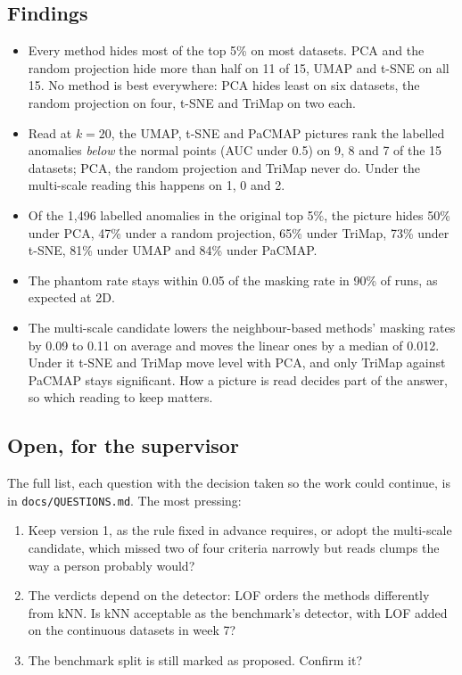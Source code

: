 \subsection*{Findings}

\begin{itemize}
  \item Every method hides most of the top 5\% on most datasets. PCA and
    the random projection hide more than half on 11 of 15, UMAP and t-SNE
    on all 15. No method is best everywhere: PCA hides least on six
    datasets, the random projection on four, t-SNE and TriMap on two each.
  \item Read at $k = 20$, the UMAP, t-SNE and PaCMAP pictures rank the
    labelled anomalies \emph{below} the normal points (AUC under 0.5) on
    9, 8 and 7 of the 15 datasets; PCA, the random projection and TriMap
    never do. Under the multi-scale reading this happens on 1, 0 and 2.
  \item Of the 1,496 labelled anomalies in the original top 5\%, the
    picture hides 50\% under PCA, 47\% under a random projection, 65\%
    under TriMap, 73\% under t-SNE, 81\% under UMAP and 84\% under PaCMAP.
  \item The phantom rate stays within 0.05 of the masking rate in 90\% of
    runs, as expected at 2D.
  \item The multi-scale candidate lowers the neighbour-based methods'
    masking rates by 0.09 to 0.11 on average and moves the linear ones by a
    median of 0.012. Under it t-SNE and TriMap move level with PCA, and only
    TriMap against PaCMAP stays significant. How a picture is read decides
    part of the answer, so which reading to keep matters.
\end{itemize}

\subsection*{Open, for the supervisor}

The full list, each question with the decision taken so the work could
continue, is in \texttt{docs/QUESTIONS.md}. The most pressing:
\begin{enumerate}
  \item Keep version 1, as the rule fixed in advance requires, or adopt the
    multi-scale candidate, which missed two of four criteria narrowly but
    reads clumps the way a person probably would?
  \item The verdicts depend on the detector: LOF orders the methods
    differently from kNN. Is kNN acceptable as the benchmark's detector,
    with LOF added on the continuous datasets in week 7?
  \item The benchmark split is still marked as proposed. Confirm it?
\end{enumerate}
